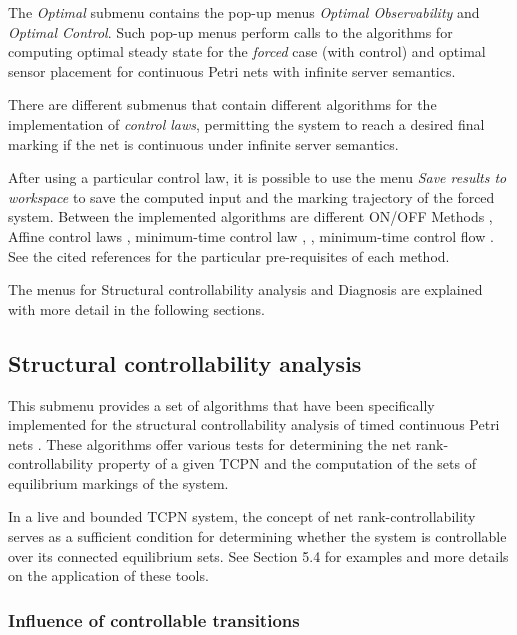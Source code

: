 The \emph{Optimal} submenu contains the pop-up menus \emph{Optimal Observability} and \emph{Optimal Control}. Such pop-up menus perform calls to the algorithms for computing optimal steady state for the \emph{forced} case (with control) \cite{mahulea2008steady} and optimal sensor placement for continuous Petri nets with infinite server semantics.

There are different submenus that contain different algorithms for the implementation of \emph{control laws}, permitting the system to reach a desired final marking if the net is continuous under infinite server semantics. 

After using a particular control law, it is possible to use the menu \emph{Save results to workspace} to save the computed input and the marking trajectory of the forced system. Between the implemented algorithms are different ON/OFF Methods \cite{ONOFFmethodsWANG2014}, Affine control laws \cite{AffineLawThesisRenato}, minimum-time control law \cite{ApproachingMinTimeAPAYDINOZKAN2011}, \cite{minTime}, minimum-time control flow \cite{MinTimeControlCF}. See the cited references for the particular pre-requisites of each method.

The menus for Structural controllability analysis and Diagnosis are explained with more detail in the following sections.

\subsection{Structural controllability analysis}

This submenu provides a set of algorithms that have been specifically implemented for the structural controllability analysis of timed continuous Petri nets \cite{arzola2023structural}. These algorithms offer various tests for determining the net rank-controllability property of a given TCPN and the computation of the sets of equilibrium markings of the system.

In a live and bounded TCPN system, the concept of net rank-controllability serves as a sufficient condition for determining whether the system is controllable over its connected equilibrium sets. See Section 5.4 for examples and more details on the application of these tools.



\subsubsection{Influence of controllable transitions}

